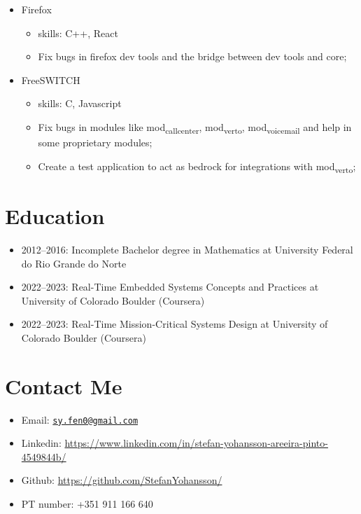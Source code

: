 \documentclass[
]{article}
\providecommand{\tightlist}{%
  \setlength{\itemsep}{0pt}\setlength{\parskip}{0pt}}
\begin{document}
\vspace{2mm}

\begin{itemize}
\tightlist
\item
  Firefox

  \begin{itemize}
  \tightlist
  \item
    skills: C++, React
  \item
    Fix bugs in firefox dev tools and the bridge between dev tools and
    core;
  \end{itemize}
\end{itemize}

\vspace{2mm}

\begin{itemize}
\tightlist
\item
  FreeSWITCH

  \begin{itemize}
  \tightlist
  \item
    skills: C, Javascript
  \item
    Fix bugs in modules like mod\textsubscript{callcenter},
    mod\textsubscript{verto}, mod\textsubscript{voicemail} and help in
    some proprietary modules;
  \item
    Create a test application to act as bedrock for integrations with
    mod\textsubscript{verto};
  \end{itemize}
\end{itemize}

\hypertarget{education}{%
\section{Education}\label{education}}

\begin{itemize}
\tightlist
\item
  2012--2016: Incomplete Bachelor degree in Mathematics at University
  Federal do Rio Grande do Norte
\item
  2022--2023: Real-Time Embedded Systems Concepts and Practices at
  University of Colorado Boulder (Coursera)
\item
  2022--2023: Real-Time Mission-Critical Systems Design at University of
  Colorado Boulder (Coursera)
\end{itemize}

\hypertarget{contact-me}{%
\section{Contact Me}\label{contact-me}}

\begin{itemize}
\tightlist
\item
  Email: \href{mailto:sy.fen0@gmail.com}{\nolinkurl{sy.fen0@gmail.com}}
\item
  Linkedin:
  \url{https://www.linkedin.com/in/stefan-yohansson-areeira-pinto-4549844b/}
\item
  Github: \url{https://github.com/StefanYohansson/}
\item
  PT number: +351 911 166 640
\end{itemize}
\end{document}

